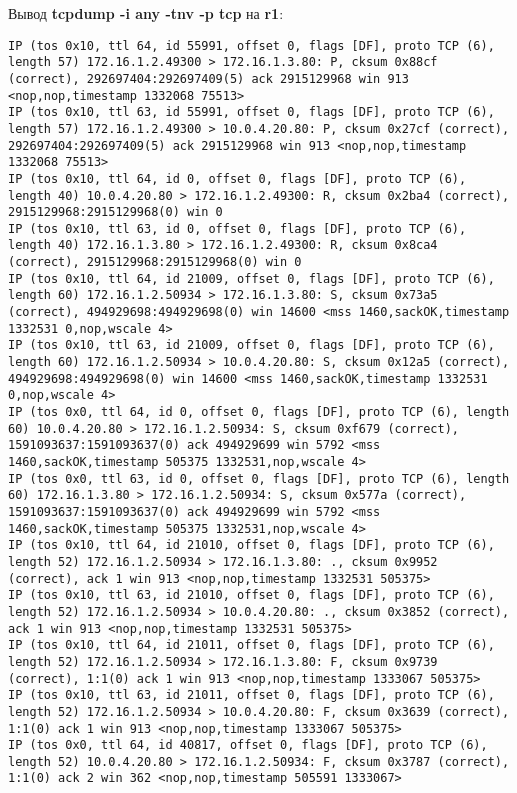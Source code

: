 \documentclass[a4paper,12pt]{article}
\begin{document}
Вывод \textbf{tcpdump -i any -tnv -p tcp} на \textbf{r1}:
\begin{Verbatim}
IP (tos 0x10, ttl 64, id 55991, offset 0, flags [DF], proto TCP (6), length 57) 172.16.1.2.49300 > 172.16.1.3.80: P, cksum 0x88cf (correct), 292697404:292697409(5) ack 2915129968 win 913 <nop,nop,timestamp 1332068 75513>
IP (tos 0x10, ttl 63, id 55991, offset 0, flags [DF], proto TCP (6), length 57) 172.16.1.2.49300 > 10.0.4.20.80: P, cksum 0x27cf (correct), 292697404:292697409(5) ack 2915129968 win 913 <nop,nop,timestamp 1332068 75513>
IP (tos 0x10, ttl 64, id 0, offset 0, flags [DF], proto TCP (6), length 40) 10.0.4.20.80 > 172.16.1.2.49300: R, cksum 0x2ba4 (correct), 2915129968:2915129968(0) win 0
IP (tos 0x10, ttl 63, id 0, offset 0, flags [DF], proto TCP (6), length 40) 172.16.1.3.80 > 172.16.1.2.49300: R, cksum 0x8ca4 (correct), 2915129968:2915129968(0) win 0
IP (tos 0x10, ttl 64, id 21009, offset 0, flags [DF], proto TCP (6), length 60) 172.16.1.2.50934 > 172.16.1.3.80: S, cksum 0x73a5 (correct), 494929698:494929698(0) win 14600 <mss 1460,sackOK,timestamp 1332531 0,nop,wscale 4>
IP (tos 0x10, ttl 63, id 21009, offset 0, flags [DF], proto TCP (6), length 60) 172.16.1.2.50934 > 10.0.4.20.80: S, cksum 0x12a5 (correct), 494929698:494929698(0) win 14600 <mss 1460,sackOK,timestamp 1332531 0,nop,wscale 4>
IP (tos 0x0, ttl 64, id 0, offset 0, flags [DF], proto TCP (6), length 60) 10.0.4.20.80 > 172.16.1.2.50934: S, cksum 0xf679 (correct), 1591093637:1591093637(0) ack 494929699 win 5792 <mss 1460,sackOK,timestamp 505375 1332531,nop,wscale 4>
IP (tos 0x0, ttl 63, id 0, offset 0, flags [DF], proto TCP (6), length 60) 172.16.1.3.80 > 172.16.1.2.50934: S, cksum 0x577a (correct), 1591093637:1591093637(0) ack 494929699 win 5792 <mss 1460,sackOK,timestamp 505375 1332531,nop,wscale 4>
IP (tos 0x10, ttl 64, id 21010, offset 0, flags [DF], proto TCP (6), length 52) 172.16.1.2.50934 > 172.16.1.3.80: ., cksum 0x9952 (correct), ack 1 win 913 <nop,nop,timestamp 1332531 505375>
IP (tos 0x10, ttl 63, id 21010, offset 0, flags [DF], proto TCP (6), length 52) 172.16.1.2.50934 > 10.0.4.20.80: ., cksum 0x3852 (correct), ack 1 win 913 <nop,nop,timestamp 1332531 505375>
IP (tos 0x10, ttl 64, id 21011, offset 0, flags [DF], proto TCP (6), length 52) 172.16.1.2.50934 > 172.16.1.3.80: F, cksum 0x9739 (correct), 1:1(0) ack 1 win 913 <nop,nop,timestamp 1333067 505375>
IP (tos 0x10, ttl 63, id 21011, offset 0, flags [DF], proto TCP (6), length 52) 172.16.1.2.50934 > 10.0.4.20.80: F, cksum 0x3639 (correct), 1:1(0) ack 1 win 913 <nop,nop,timestamp 1333067 505375>
IP (tos 0x0, ttl 64, id 40817, offset 0, flags [DF], proto TCP (6), length 52) 10.0.4.20.80 > 172.16.1.2.50934: F, cksum 0x3787 (correct), 1:1(0) ack 2 win 362 <nop,nop,timestamp 505591 1333067>

\end{Verbatim}
\end{document}
